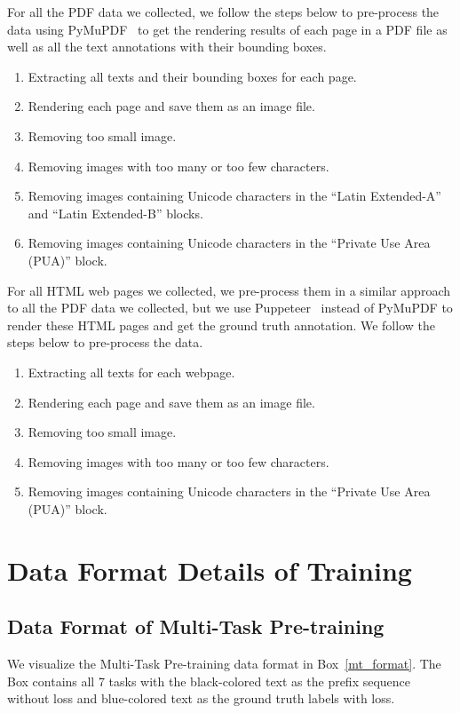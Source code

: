 \documentclass{article}
\begin{document}
For all the PDF data we collected, we follow the steps below to pre-process the data using PyMuPDF~\citep{pymupdf} to get the rendering results of each page in a PDF file as well as all the text annotations with their bounding boxes.
\begin{enumerate}
    \item Extracting all texts and their bounding boxes for each page.
    \item Rendering each page and save them as an image file.
    \item Removing too small image.
    \item Removing images with too many or too few characters.
    \item Removing images containing Unicode characters in the ``Latin Extended-A'' and ``Latin Extended-B'' blocks.
    \item Removing images containing Unicode characters in the ``Private Use Area (PUA)'' block.
\end{enumerate}

For all HTML web pages we collected, we pre-process them in a similar approach to all the PDF data we collected, but we use Puppeteer~\citep{puppeteer} instead of PyMuPDF to render these HTML pages and get the ground truth annotation. We follow the steps below to pre-process the data.
\begin{enumerate}
    \item Extracting all texts for each webpage.
    \item Rendering each page and save them as an image file.
    \item Removing too small image.
    \item Removing images with too many or too few characters.
    \item Removing images containing Unicode characters in the ``Private Use Area (PUA)'' block.
\end{enumerate}

\section{Data Format Details of Training}

\subsection{Data Format of Multi-Task Pre-training}
\label{app:data_format_stage2}

We visualize the Multi-Task Pre-training data format in Box~\ref{mt_format}. The Box contains all 7 tasks with the black-colored text as the prefix sequence without loss and blue-colored text as the ground truth labels with loss.
\end{document}
